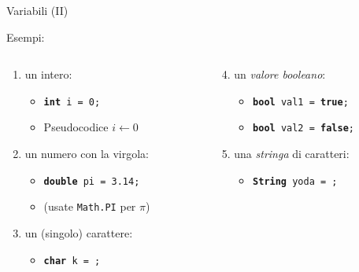 \begin{frame}{Variabili (II)}

  Esempi:   
    \begin{columns}[T] %
      \begin{column}[T]{5cm} %
	\begin{enumerate}[<+->]
	  \item un intero:
	  \begin{itemize}
	    \item \texttt{\textbf{int} i = 0;}
	    \item Pseudocodice $i \gets 0$
	  \end{itemize}
	  \item un numero con la virgola:
	  \begin{itemize}
	    \item \texttt{\textbf{double} pi = 3.14;}
	    \item (usate \texttt{Math.PI} per $\pi$)
	  \end{itemize}
	  \item un (singolo) carattere:
	  \begin{itemize}
	    \item \texttt{\textbf{char} k = ;}
	  \end{itemize}
	\end{enumerate}
      \end{column}
      \begin{column}[T]{7cm} %
	\begin{enumerate}[<+->]
	  \setcounter{enumi}{3}
	  \item un \emph{valore booleano}:
	  \begin{itemize}
	    \item \texttt{\textbf{bool} val1 = \textbf{true};}
	    \item \texttt{\textbf{bool} val2 = \textbf{false};}
	  \end{itemize}
	  \item una \emph{stringa} di caratteri:
	  \begin{itemize}
	    \item \texttt{\textbf{String} yoda = ;}
	  \end{itemize}
	\end{enumerate}
      \end{column}
    \end{columns}
\end{frame}

